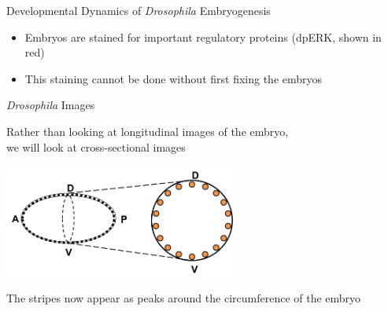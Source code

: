 \documentclass[10pt]{beamer}
\begin{document}
\begin{frame}{Developmental Dynamics of {\em Drosophila} Embryogenesis}
\begin{center}
\end{center}

\begin{itemize}
\item Embryos are stained for important regulatory proteins (dpERK, shown in red) 

\item This staining cannot be done without first fixing the embryos
\end{itemize}

\end{frame}

\begin{frame}{{\em Drosophila} Images}

\begin{center}
Rather than looking at longitudinal images of the embryo, \\
we will look at cross-sectional images

\includegraphics[width=3in]{drosophila_schematic}


The stripes now appear as peaks around the circumference of the embryo

\end{center}

\end{frame}
\end{document}
